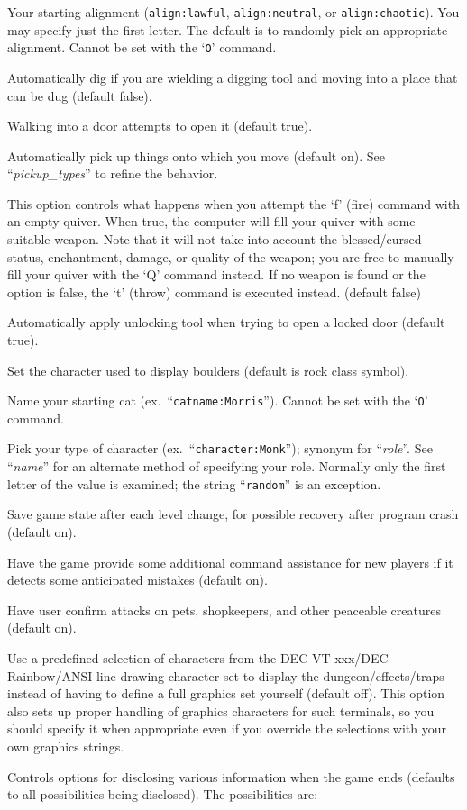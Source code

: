 \blist{}
\item[\ib{align}]
Your starting alignment ({\tt align:lawful}, {\tt align:neutral},
or {\tt align:chaotic}).  You may specify just the first letter.
The default is to randomly pick an appropriate alignment.
Cannot be set with the `{\tt O}' command.
\item[\ib{autodig}]
Automatically dig if you are wielding a digging tool and moving into a place
that can be dug (default false).
\item[\ib{autoopen}]
Walking into a door attempts to open it (default true).
\item[\ib{autopickup}]
Automatically pick up things onto which you move (default on).
See ``{\it pickup\_types\/}'' to refine the behavior.
\item[\ib{autoquiver}]
This option controls what happens when you attempt the `f' (fire)
command with an empty quiver.  When true, the computer will fill
your quiver with some suitable weapon.  Note that it will not take
into account the blessed/cursed status, enchantment, damage, or
quality of the weapon; you are free to manually fill your quiver with
the `Q' command instead.  If no weapon is found or the option is
false, the `t' (throw) command is executed instead.  (default false)
\item[\ib{autounlock}]
Automatically apply unlocking tool when trying to open a locked door (default true).
\item[\ib{boulder}]
Set the character used to display boulders (default is rock class symbol).
\item[\ib{catname}]
Name your starting cat (ex.\ ``{\tt catname:Morris}'').
Cannot be set with the `{\tt O}' command.
\item[\ib{character}]
Pick your type of character (ex.\ ``{\tt character:Monk}'');
synonym for ``{\it role\/}''.  See ``{\it name\/}'' for an alternate method
of specifying your role.  Normally only the first letter of
the value is examined; the string ``{\tt random}'' is an exception.
\item[\ib{checkpoint}]
Save game state after each level change, for possible recovery after
program crash (default on).
\item[\ib{cmdassist}]
Have the game provide some additional command assistance for new 
players if it detects some anticipated mistakes (default on).
\item[\ib{confirm}]
Have user confirm attacks on pets, shopkeepers, and other
peaceable creatures (default on).
\item[\ib{DECgraphics}]
Use a predefined selection of characters from the DEC VT-xxx/DEC
Rainbow/ANSI line-drawing character set to display the dungeon/effects/traps
instead of having to define a full graphics set yourself (default off).
This option also sets up proper handling of graphics
characters for such terminals, so you should specify it when appropriate
even if you override the selections with your own graphics strings.
\item[\ib{disclose}]
Controls options for disclosing various information when the game ends (defaults
to all possibilities being disclosed).
The possibilities are:

